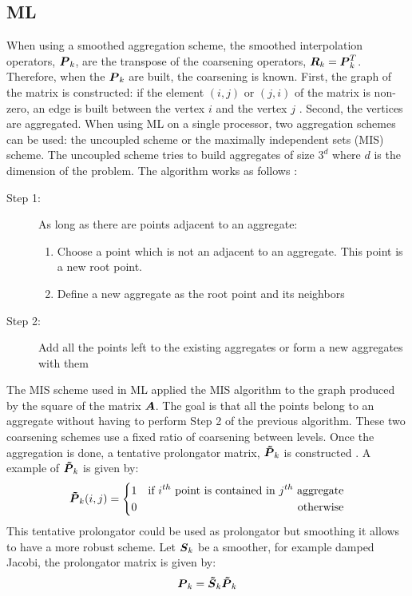 \subsection{ML}
When using a smoothed aggregation scheme, the smoothed interpolation operators,
$\boldsymbol{P}_k$, are the transpose of the coarsening operators,
$\boldsymbol{R}_k=\boldsymbol{P}_k^T$. Therefore, when the $\boldsymbol{P}_k$ are built, the
coarsening is known. First, the graph of the matrix is constructed: if the element
$(i,j)$ or $(j,i)$ of the matrix is non-zero, an edge is built between the
vertex $i$ and the vertex $j$ \cite{ml_guide}. Second, the vertices are
aggregated. When using ML on a single processor, two aggregation schemes can
be used: the uncoupled scheme or the maximally independent sets (MIS) scheme. 
The uncoupled scheme tries to build aggregates of size $3^d$ where $d$ is the
dimension of the problem. The algorithm works as follows \cite{mis}:
\begin{description}
  \item[Step 1:] As long as there are points adjacent to an aggregate:
    \begin{enumerate}
      \item Choose a point which is not an adjacent to an
        aggregate. This point is a new root point.
      \item Define a new aggregate as the root point and its neighbors 
    \end{enumerate}
  \item[Step 2:] Add all the points left to the existing aggregates or form a
    new aggregates with them
\end{description}
The MIS scheme used in ML applied the MIS algorithm \cite{graph_coloring} to
the graph produced by the square of the matrix $\boldsymbol{A}$. The goal is that all
the points belong to an aggregate without having to perform Step 2 of the
previous algorithm. These two coarsening schemes use a fixed ratio of 
coarsening between levels. Once the aggregation is done, a tentative
prolongator matrix, $\boldsymbol{\tilde{P}}_k$ is constructed \cite{mis}. A example of
$\boldsymbol{\tilde{P}}_k$ is given by:
\begin{equation}
  \boldsymbol{\tilde{P}}_k(i,j) = \left\{
  \begin{aligned}
    &1 &\textrm{if }i^{th}\textrm{ point is contained in }j^{th}\textrm{
    aggregate}\\
    & 0 &\textrm{otherwise}
  \end{aligned}
  \right.
\end{equation}
This tentative prolongator could be used as prolongator but smoothing it
allows to have a more robust scheme. Let $\boldsymbol{S}_k$ be a smoother, for example
damped Jacobi, the prolongator matrix is given by:
\begin{equation}
  \boldsymbol{P}_k = \boldsymbol{\tilde{S}}_k \boldsymbol{\tilde{P}}_k
\end{equation}

